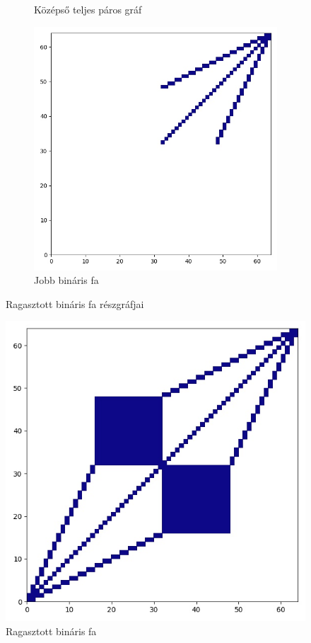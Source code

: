 \begin{figure}[H]
\begin{subfigure}{.3\linewidth}
    \caption{Középső teljes páros gráf}
  \end{subfigure}
  \begin{subfigure}{.3\linewidth}
    \centering
    \includegraphics[width=\linewidth]{./figures/ragasztott_binaris/subgraph_01.jpg}
    \caption{Jobb bináris fa}
  \end{subfigure}
  \caption{Ragasztott bináris fa részgráfjai}
\end{figure}

\begin{figure}[H]
  \centering
  \includegraphics[width=0.5\linewidth]{./figures/ragasztott_binaris/graph.jpg}
  \caption{Ragasztott bináris fa}
\end{figure}


